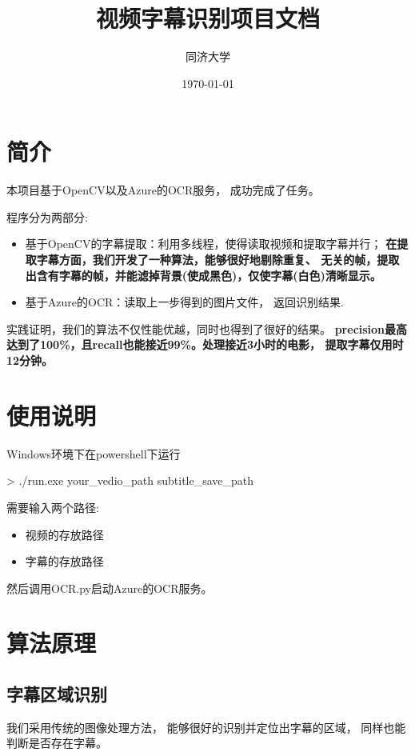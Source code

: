 \documentclass{article}
\title{视频字幕识别项目文档}
\author{同济大学}
\date{\today}
\begin{document}
        \maketitle
        \section{简介}
        本项目基于OpenCV以及Azure的OCR服务，
        成功完成了任务。

        程序分为两部分:
        \begin{itemize}
            \item 基于OpenCV的字幕提取：利用多线程，使得读取视频和提取字幕并行；
            \textbf{在提取字幕方面，我们开发了一种算法，能够很好地剔除重复、
            无关的帧，提取出含有字幕的帧，并能滤掉背景(使成黑色)，仅使字幕(白色)清晰显示。}
            \item 基于Azure的OCR：读取上一步得到的图片文件，
            返回识别结果.
        \end{itemize}

        实践证明，我们的算法不仅性能优越，同时也得到了很好的结果。\textbf{
            precision最高达到了100\%，且recall也能接近99\%。处理接近3小时的电影，
        提取字幕仅用时12分钟。}
        
        \section{使用说明}
        Windows环境下在powershell下运行

        > ./run.exe  your\_vedio\_path  subtitle\_save\_path

        需要输入两个路径:
        \begin{itemize}
            \item 视频的存放路径
            \item 字幕的存放路径
        \end{itemize}

        然后调用OCR.py启动Azure的OCR服务。
        \section{算法原理}
            \subsection{字幕区域识别}
                我们采用传统的图像处理方法，
                能够很好的识别并定位出字幕的区域，
                同样也能判断是否存在字幕。
\end{document}
